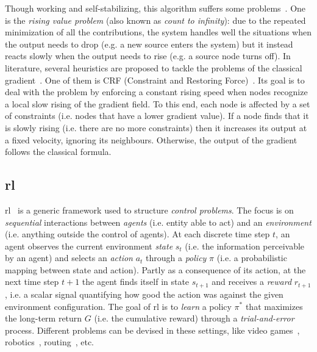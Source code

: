 Though working and self-stabilizing,
 this algorithm suffers some problems~\cite{DBLP:conf/saso/AudritoCDV17}.
%
One is the \emph{rising value problem} (also known as \emph{count to infinity}): due to the repeated minimization of all the contributions, the system handles well the situations when the output needs to drop (e.g. a new source enters the system) but it instead reacts slowly when the output needs to rise (e.g. a source node turns off). 
% 
In literature, several heuristics are proposed to tackle the problems of the classical gradient~\cite{DBLP:conf/saso/AudritoCDV17}.
%
%
One of them is CRF (Constraint and Restoring Force)~\cite{DBLP:conf/sac/BealBVT08}. Its goal is to deal with the problem by enforcing a constant rising speed when nodes recognize a local slow rising of the gradient field. 
%
To this end, each node is affected by a set of constraints (i.e. nodes that have a lower gradient value). 
%
If a node finds that it is slowly rising (i.e. there are no more constraints) then it increases its output at a fixed velocity, ignoring its neighbours.
%
Otherwise, the output of the gradient follows the classical formula. 
%


\subsection{\acl{rl}}\label{s:background:rl}

\acl{rl}~\cite{sutton2018reinforcement-learning} is a generic framework 
 used to structure \emph{control problems}. 
%
The focus is on \emph{sequential} interactions between \emph{agents}
 (i.e. entity able to act) and an \emph{environment} 
 (i.e. anything outside the control of agents). 
%
At each discrete time step $t$, an agent observes the current environment \emph{state} $s_t$ 
 (i.e. the information perceivable by an agent) and selects an \emph{action} $a_t$ through a \emph{policy} $\pi$ (i.e. a probabilistic mapping between state and action). 
%
Partly as a consequence of its action, at the next time step $t+1$ the agent finds itself in state $s_{t+1}$ and receives a \emph{reward} $r_{t+1}$, 
 i.e. a scalar signal quantifying how good the action was against the given environment configuration. 
%
The goal of \ac{rl} is to \emph{learn} a policy \emph{$\pi^*$} that maximizes the long-term return $G$ (i.e. the cumulative reward) through a \emph{trial-and-error} process. 
%
Different problems can be devised in these settings, like video games~\cite{DBLP:journals/spm/ArulkumaranDBB17}, robotics~\cite{DBLP:journals/ijrr/KoberBP13}, routing~\cite{DBLP:journals/comsur/LuongHGNWLK19}, etc.

